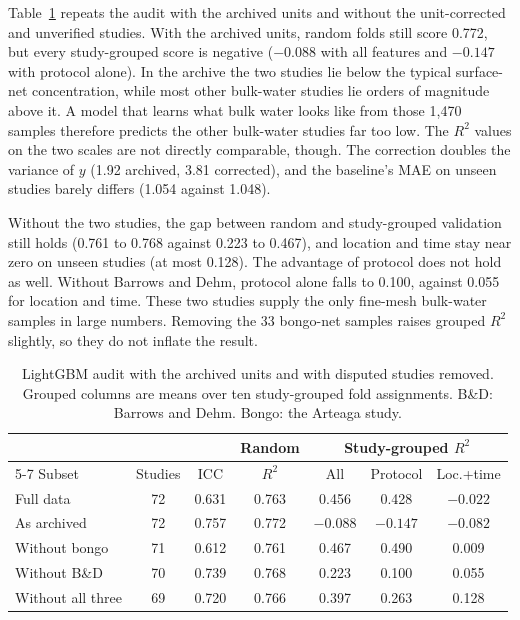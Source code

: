 \documentclass[12pt,a4paper]{report}
\newcommand{\Rsq}{$R^2$}
\begin{document}
Table~\ref{tab:sensitivity} repeats the audit with the archived units and without the unit-corrected and unverified studies. With the archived units, random folds still score 0.772, but every study-grouped score is negative ($-0.088$ with all features and $-0.147$ with protocol alone). In the archive the two studies lie below the typical surface-net concentration, while most other bulk-water studies lie orders of magnitude above it. A model that learns what bulk water looks like from those 1,470 samples therefore predicts the other bulk-water studies far too low. The \Rsq{} values on the two scales are not directly comparable, though. The correction doubles the variance of $y$ (1.92 archived, 3.81 corrected), and the baseline's MAE on unseen studies barely differs (1.054 against 1.048).

Without the two studies, the gap between random and study-grouped validation still holds (0.761 to 0.768 against 0.223 to 0.467), and location and time stay near zero on unseen studies (at most 0.128). The advantage of protocol does not hold as well. Without Barrows and Dehm, protocol alone falls to 0.100, against 0.055 for location and time. These two studies supply the only fine-mesh bulk-water samples in large numbers. Removing the 33 bongo-net samples raises grouped \Rsq{} slightly, so they do not inflate the result.

\begin{table}[!htbp]
\centering
\caption[LightGBM audit with archived units and with disputed studies removed]{LightGBM audit with the archived units and with disputed studies removed. Grouped columns are means over ten study-grouped fold assignments. B\&D: Barrows and Dehm. Bongo: the Arteaga study.}
\label{tab:sensitivity}
\setlength{\tabcolsep}{3pt}
\begin{tabular}{@{}lcccccc@{}}
\toprule
 & & & Random & \multicolumn{3}{c}{Study-grouped \Rsq}\\
\cmidrule(lr){5-7}
Subset & Studies & ICC & \Rsq & All & Protocol & Loc.+time\\
\midrule
Full data & 72 & 0.631 & 0.763 & 0.456 & 0.428 & $-0.022$\\
As archived & 72 & 0.757 & 0.772 & $-0.088$ & $-0.147$ & $-0.082$\\
Without bongo & 71 & 0.612 & 0.761 & 0.467 & 0.490 & 0.009\\
Without B\&D & 70 & 0.739 & 0.768 & 0.223 & 0.100 & 0.055\\
Without all three & 69 & 0.720 & 0.766 & 0.397 & 0.263 & 0.128\\
\bottomrule
\end{tabular}
\end{table}
\end{document}
